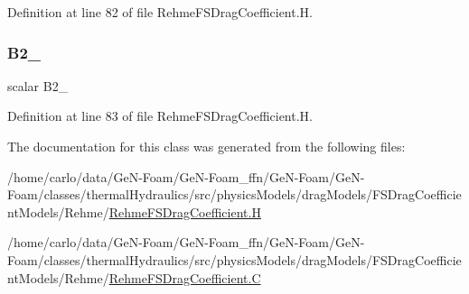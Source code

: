 Definition at line 82 of file Rehme\+F\+S\+Drag\+Coefficient.\+H.

\mbox{\label{classFoam_1_1FSDragCoefficientModels_1_1Rehme_a977e9d92f6ccebb18e888b2a99a16705}} 
\subsubsection{\texorpdfstring{B2\+\_\+}{B2\_}}
{\footnotesize\ttfamily scalar B2\+\_\+\hspace{0.3cm}{\ttfamily [protected]}}



Definition at line 83 of file Rehme\+F\+S\+Drag\+Coefficient.\+H.



The documentation for this class was generated from the following files\+:\begin{DoxyCompactItemize}
\item 
/home/carlo/data/\+Ge\+N-\/\+Foam/\+Ge\+N-\/\+Foam\+\_\+ffn/\+Ge\+N-\/\+Foam/\+Ge\+N-\/\+Foam/classes/thermal\+Hydraulics/src/physics\+Models/drag\+Models/\+F\+S\+Drag\+Coefficient\+Models/\+Rehme/\hyperlink{RehmeFSDragCoefficient_8H}{Rehme\+F\+S\+Drag\+Coefficient.\+H}\item 
/home/carlo/data/\+Ge\+N-\/\+Foam/\+Ge\+N-\/\+Foam\+\_\+ffn/\+Ge\+N-\/\+Foam/\+Ge\+N-\/\+Foam/classes/thermal\+Hydraulics/src/physics\+Models/drag\+Models/\+F\+S\+Drag\+Coefficient\+Models/\+Rehme/\hyperlink{RehmeFSDragCoefficient_8C}{Rehme\+F\+S\+Drag\+Coefficient.\+C}\end{DoxyCompactItemize}
